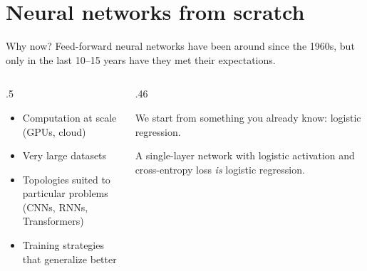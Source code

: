 \documentclass[aspectratio=169,10pt]{beamer}
\newcommand{\sessiontag}{}
\begin{document}
\renewcommand{\sessiontag}{Session 1 \textbullet{} notebook DL1}
\section{Neural networks from scratch}

\begin{frame}{Why now?}
Feed-forward neural networks have been around since the 1960s, but only in the last
10--15 years have they met their expectations.

\begin{columns}[T]
\begin{column}{.5\textwidth}
\begin{itemize}
  \item Computation at scale (GPUs, cloud)
  \item Very large datasets
  \item Topologies suited to particular problems\\(CNNs, RNNs, Transformers)
  \item Training strategies that generalize better
\end{itemize}
\end{column}
\begin{column}{.46\textwidth}
\begin{keybox}
\small
We start from something you already know: \alert{logistic regression}.

A single-layer network with logistic activation and cross-entropy loss \emph{is}
logistic regression.
\end{keybox}
\end{column}
\end{columns}
\end{frame}
\end{document}
